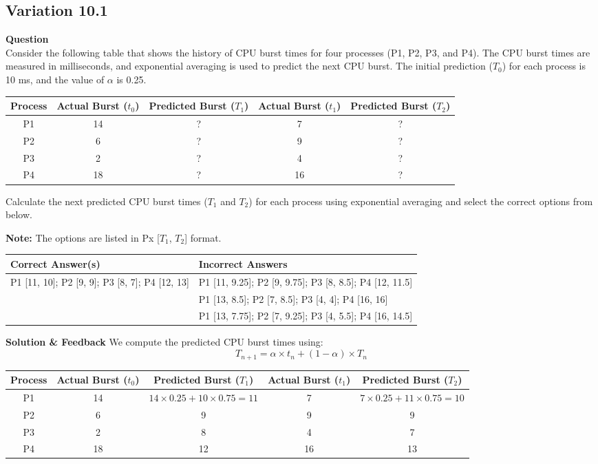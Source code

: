 \subsection{Variation 10.1}
\textbf{Question}\\
Consider the following table that shows the history of CPU burst times for four processes (P1, P2, P3, and P4). The CPU burst times are measured in milliseconds, and exponential averaging is used to predict the next CPU burst. The initial prediction ($T_0$) for each process is 10 ms, and the value of $\alpha$ is 0.25.\\
\begin{center}
\begin{tabular}{|c|c|c|c|c|}
\hline
Process & Actual Burst ($t_0$) & Predicted Burst ($T_1$) & Actual Burst ($t_1$) & Predicted Burst ($T_2$) \\
\hline
P1 & 14 & ? & 7 & ? \\
P2 & 6 & ? & 9 & ? \\
P3 & 2 & ? & 4 & ? \\
P4 & 18 & ? & 16 & ? \\
\hline
\end{tabular}
\end{center}

Calculate the next predicted CPU burst times ($T_1$ and $T_2$) for each process using exponential averaging and select the correct options from below.

\textbf{Note:} The options are listed in Px [$T_1$, $T_2$] format.

\begin{center}
\begin{tabular}{|l|l|}
\hline
\textbf{Correct Answer(s)} & \textbf{Incorrect Answers} \\
\hline
P1 [11, 10]; P2 [9, 9]; P3 [8, 7]; P4 [12, 13] & P1 [11, 9.25]; P2 [9, 9.75]; P3 [8, 8.5]; P4 [12, 11.5] \\
 & P1 [13, 8.5]; P2 [7, 8.5]; P3 [4, 4]; P4 [16, 16] \\
 & P1 [13, 7.75]; P2 [7, 9.25]; P3 [4, 5.5]; P4 [16, 14.5] \\
\hline
\end{tabular}
\end{center}

\textbf{Solution \& Feedback}
We compute the predicted CPU burst times using:
\[ T_{n+1} = \alpha \times t_n + (1 - \alpha) \times T_n \]

\begin{center}
\begin{tabular}{|c|c|c|c|c|}
\hline
Process & Actual Burst ($t_0$) & Predicted Burst ($T_1$) & Actual Burst ($t_1$) & Predicted Burst ($T_2$) \\
\hline
P1 & 14 & \(14 \times 0.25 + 10 \times 0.75 = 11\) & 7 & \(7 \times 0.25 + 11 \times 0.75 = 10 \) \\
P2 & 6 & 9 & 9 & 9 \\
P3 & 2 & 8 & 4 & 7 \\
P4 & 18 & 12 & 16 & 13 \\
\hline
\end{tabular}
\end{center}

